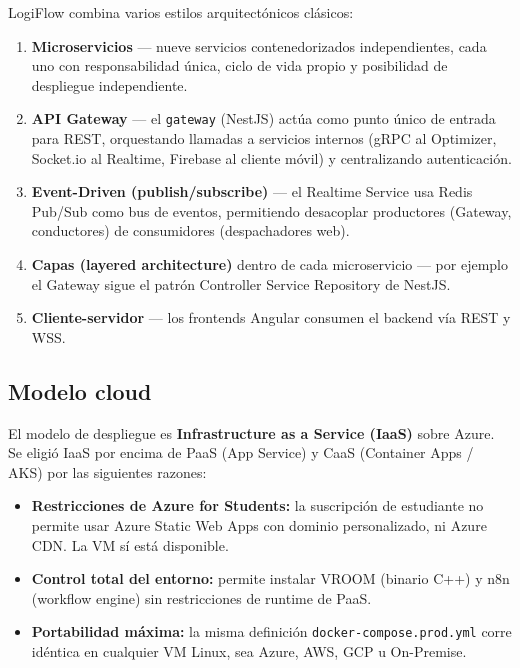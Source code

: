 \documentclass[12pt,a4paper,oneside]{article}
\begin{document}
LogiFlow combina varios estilos arquitect\'onicos cl\'asicos:

\begin{enumerate}[leftmargin=*]
  \item \textbf{Microservicios} --- nueve servicios contenedorizados independientes, cada uno con responsabilidad \'unica, ciclo de vida propio y posibilidad de despliegue independiente.
  \item \textbf{API Gateway} --- el \texttt{gateway} (NestJS) act\'ua como punto \'unico de entrada para REST, orquestando llamadas a servicios internos (gRPC al Optimizer, Socket.io al Realtime, Firebase al cliente m\'ovil) y centralizando autenticaci\'on.
  \item \textbf{Event-Driven (publish/subscribe)} --- el Realtime Service usa Redis Pub/Sub como bus de eventos, permitiendo desacoplar productores (Gateway, conductores) de consumidores (despachadores web).
  \item \textbf{Capas (layered architecture)} dentro de cada microservicio --- por ejemplo el Gateway sigue el patr\'on Controller \textrightarrow{} Service \textrightarrow{} Repository de NestJS.
  \item \textbf{Cliente-servidor} --- los frontends Angular consumen el backend v\'ia REST y WSS.
\end{enumerate}

\subsection{Modelo cloud}

El modelo de despliegue es \textbf{Infrastructure as a Service (IaaS)} sobre Azure. Se eligi\'o IaaS por encima de PaaS (App Service) y CaaS (Container Apps / AKS) por las siguientes razones:

\begin{itemize}[leftmargin=*]
  \item \textbf{Restricciones de Azure for Students:} la suscripci\'on de estudiante no permite usar Azure Static Web Apps con dominio personalizado, ni Azure CDN. La VM s\'i est\'a disponible.
  \item \textbf{Control total del entorno:} permite instalar VROOM (binario C++) y n8n (workflow engine) sin restricciones de runtime de PaaS.
  \item \textbf{Portabilidad m\'axima:} la misma definici\'on \texttt{docker-compose.prod.yml} corre id\'entica en cualquier VM Linux, sea Azure, AWS, GCP u On-Premise.
\end{itemize}
\end{document}
